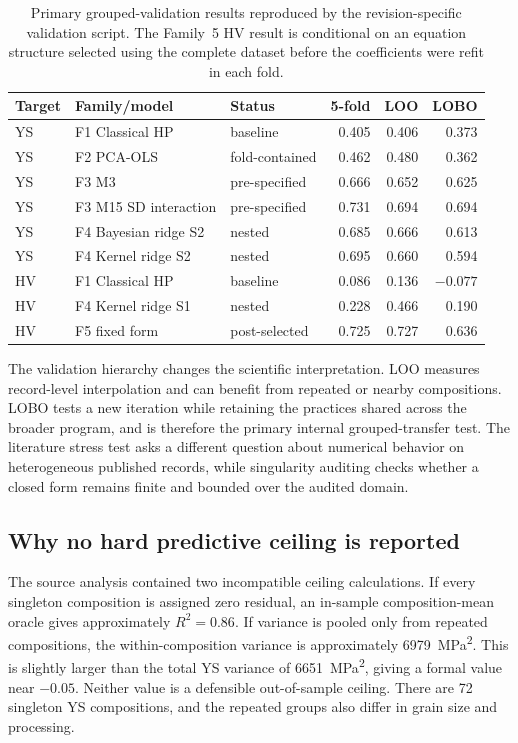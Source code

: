 \documentclass[a4paper,11pt]{article}
\begin{document}
\begin{table}[H]
\centering
\caption{Primary grouped-validation results reproduced by the revision-specific validation script. The Family~5 HV result is conditional on an equation structure selected using the complete dataset before the coefficients were refit in each fold.}
\label{tab:grouped}
\small
\setlength{\tabcolsep}{4pt}
\begin{tabular}{lllrrr}
\toprule
Target & Family/model & Status & 5-fold & LOO & LOBO \\
\midrule
YS & F1 Classical HP & baseline & 0.405 & 0.406 & 0.373 \\
YS & F2 PCA-OLS & fold-contained & 0.462 & 0.480 & 0.362 \\
YS & F3 M3 & pre-specified & 0.666 & 0.652 & 0.625 \\
YS & F3 M15 SD interaction & pre-specified & 0.731 & 0.694 & 0.694 \\
YS & F4 Bayesian ridge S2 & nested & 0.685 & 0.666 & 0.613 \\
YS & F4 Kernel ridge S2 & nested & 0.695 & 0.660 & 0.594 \\
HV & F1 Classical HP & baseline & 0.086 & 0.136 & $-0.077$ \\
HV & F4 Kernel ridge S1 & nested & 0.228 & 0.466 & 0.190 \\
HV & F5 fixed form & post-selected & 0.725 & 0.727 & 0.636 \\
\bottomrule
\end{tabular}
\end{table}

The validation hierarchy changes the scientific interpretation. LOO measures record-level interpolation and can benefit from repeated or nearby compositions. LOBO tests a new iteration while retaining the practices shared across the broader program, and is therefore the primary internal grouped-transfer test. The literature stress test asks a different question about numerical behavior on heterogeneous published records, while singularity auditing checks whether a closed form remains finite and bounded over the audited domain.

\subsection{Why no hard predictive ceiling is reported}

The source analysis contained two incompatible ceiling calculations. If every singleton composition is assigned zero residual, an in-sample composition-mean oracle gives approximately $R^2=0.86$. If variance is pooled only from repeated compositions, the within-composition variance is approximately \SI{6979}{MPa^2}. This is slightly larger than the total YS variance of \SI{6651}{MPa^2}, giving a formal value near $-0.05$. Neither value is a defensible out-of-sample ceiling. There are 72 singleton YS compositions, and the repeated groups also differ in grain size and processing.
\end{document}
